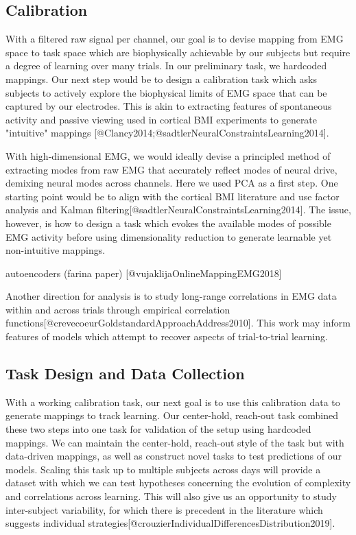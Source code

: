 \documentclass[../main.tex]{subfiles}
\begin{document}
  

\subsection{Calibration}

With a filtered raw signal per channel, our goal is to devise mapping from EMG space to task space which are biophysically achievable by our subjects but require a degree of learning over many trials. In our preliminary task, we hardcoded mappings. Our next step would be to design a calibration task which asks subjects to actively explore the biophysical limits of EMG space that can be captured by our electrodes. This is akin to extracting features of spontaneous activity and passive viewing used in cortical BMI experiments to generate "intuitive" mappings [@Clancy2014;@sadtlerNeuralConstraintsLearning2014].

With high-dimensional EMG, we would ideally devise a principled method of extracting modes from raw EMG that accurately reflect modes of neural drive, demixing neural modes across channels. Here we used PCA as a first step. One starting point would be to align with the cortical BMI literature and use factor analysis and Kalman filtering[@sadtlerNeuralConstraintsLearning2014]. The issue, however, is how to design a task which evokes the available modes of possible EMG activity before using dimensionality reduction to generate learnable yet non-intuitive mappings.

 autoencoders (farina paper) [@vujaklijaOnlineMappingEMG2018]  

 Another direction for analysis is to study long-range correlations in EMG data within and across trials through empirical correlation functions[@crevecoeurGoldstandardApproachAddress2010]. This work may inform features of models which attempt to recover aspects of trial-to-trial learning. 

\subsection{Task Design and Data Collection}

With a working calibration task, our next goal is to use this calibration data to generate mappings to track learning. Our center-hold, reach-out task combined these two steps into one task for validation of the setup using hardcoded mappings. We can maintain the center-hold, reach-out style of the task but with data-driven mappings, as well as construct novel tasks to test predictions of our models. Scaling this task up to multiple subjects across days will provide a dataset with which we can test hypotheses concerning the evolution of complexity and correlations across learning. This will also give us an opportunity to study inter-subject variability, for which there is precedent in the literature which suggests individual strategies[@crouzierIndividualDifferencesDistribution2019].
\end{document}
